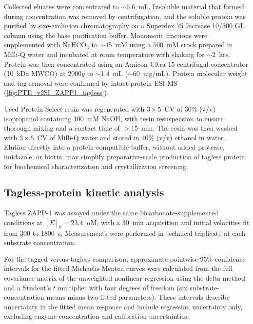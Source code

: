 Collected eluates were concentrated to $\sim$6.6~mL. Insoluble material that formed during concentration was removed by centrifugation, and the soluble protein was purified by size-exclusion chromatography on a Superdex 75 Increase 10/300 GL column using the base purification buffer. Monomeric fractions were supplemented with NaHCO$_3$ to $\sim$45~mM using a 500~mM stock prepared in Milli-Q water and incubated at room temperature with shaking for $\sim$2~hrs. Protein was then concentrated using an Amicon Ultra-15 centrifugal concentrator (10~kDa MWCO) at 2000$g$ to $\sim$1.4~mL ($\sim$60~mg/mL). Protein molecular weight and tag removal were confirmed by intact-protein ESI-MS (\cref{fig:PTE_v2SI_ZAPP1_tagless}).

Used Protein Select resin was regenerated with $3 \times 5$~CV of 30\% (v/v) isopropanol containing 100~mM NaOH, with resin resuspension to ensure thorough mixing and a contact time of $>15$~min. The resin was then washed with $3 \times 5$~CV of Milli-Q water and stored in 40\% (v/v) ethanol in water. Elution directly into a protein-compatible buffer, without added protease, imidazole, or biotin, may simplify preparative-scale production of tagless protein for biochemical characterization and crystallization screening.
\subsection{Tagless-protein kinetic analysis}

Tagless ZAPP-1 was assayed under the same bicarbonate-supplemented conditions at \([E]_0 = 23.4\)~$\mu$M, with a 30~min acquisition and initial velocities fit from 300 to 1800~s. Measurements were performed in technical triplicate at each substrate concentration.

For the tagged-versus-tagless comparison, approximate pointwise 95\% confidence intervals for the fitted Michaelis-Menten curves were calculated from the full covariance matrix of the unweighted nonlinear regression using the delta method and a Student's $t$ multiplier with four degrees of freedom (six substrate-concentration means minus two fitted parameters). These intervals describe uncertainty in the fitted mean response and include regression uncertainty only, excluding enzyme-concentration and calibration uncertainties.
